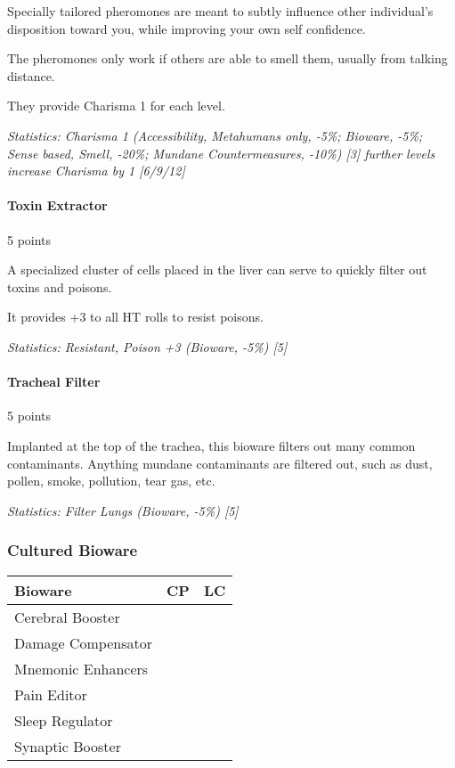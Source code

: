 \begin{multicols*}{3}
	Specially tailored pheromones are meant to subtly influence other individual's disposition toward you, while improving your own self confidence. 
	
	The pheromones only work if others are able to smell them, usually from talking distance. 
	
	They provide Charisma 1 for each level.
	
	\textit{\textcolor{OliveGreen}{Statistics: Charisma 1 (Accessibility, Metahumans only, -5\%; Bioware, -5\%; Sense based, Smell, -20\%; Mundane Countermeasures, -10\%) [3] further levels increase Charisma by 1 [6/9/12]}}
	
	\paragraph{Toxin Extractor}
	\begin{flushright}
		5 points
	\end{flushright}
	
	A specialized cluster of cells placed in the liver can serve to quickly filter out toxins and poisons.
	
	It provides +3 to all HT rolls to resist poisons.
	
	\textit{\textcolor{OliveGreen}{Statistics: Resistant, Poison +3 (Bioware, -5\%) [5]}}
	
	\paragraph{Tracheal Filter}
	\begin{flushright}
		5 points
	\end{flushright}
	
	Implanted at the top of the trachea, this bioware filters out many common contaminants. Anything mundane contaminants are filtered out, such as dust, pollen, smoke, pollution, tear gas, etc.
	
	\textit{\textcolor{OliveGreen}{Statistics: Filter Lungs (Bioware, -5\%) [5]}}
	
	\subsubsection{Cultured Bioware}
	
	\begin{center}
		\begin{tabularx}{0.32\textwidth}{|X|c|c|}
			\hline
			Bioware & CP & LC\\
			\hline
			\hline
			Cerebral Booster & & \\
			Damage Compensator & & \\
			Mnemonic Enhancers & & \\
			Pain Editor & & \\
			Sleep Regulator & & \\
			Synaptic Booster & & \\
			\hline
		\end{tabularx}
	\end{center}
	

\end{multicols*}
